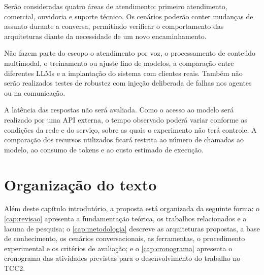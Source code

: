 Serão consideradas quatro áreas de atendimento: primeiro atendimento, comercial, ouvidoria e suporte técnico. Os cenários poderão conter mudanças de assunto durante a conversa, permitindo verificar o comportamento das arquiteturas diante da necessidade de um novo encaminhamento.

Não fazem parte do escopo o atendimento por voz, o processamento de conteúdo multimodal, o treinamento ou ajuste fino de modelos, a comparação entre diferentes LLMs e a implantação do sistema com clientes reais. Também não serão realizados testes de robustez com injeção deliberada de falhas nos agentes ou na comunicação.

A latência das respostas não será avaliada. Como o acesso ao modelo será realizado por uma API externa, o tempo observado poderá variar conforme as condições da rede e do serviço, sobre as quais o experimento não terá controle. A comparação dos recursos utilizados ficará restrita ao número de chamadas ao modelo, ao consumo de tokens e ao custo estimado de execução.

\section{Organização do texto}\label{sec:organizacao}

Além deste capítulo introdutório, a proposta está organizada da seguinte forma: o \autoref{cap:revisao} apresenta a fundamentação teórica, os trabalhos relacionados e a lacuna de pesquisa;
o \autoref{cap:metodologia} descreve as arquiteturas propostas, a base de conhecimento, os cenários conversacionais, as ferramentas, o procedimento experimental e os critérios de avaliação;
e o \autoref{cap:cronograma} apresenta o cronograma das atividades previstas para o desenvolvimento do trabalho no TCC2.